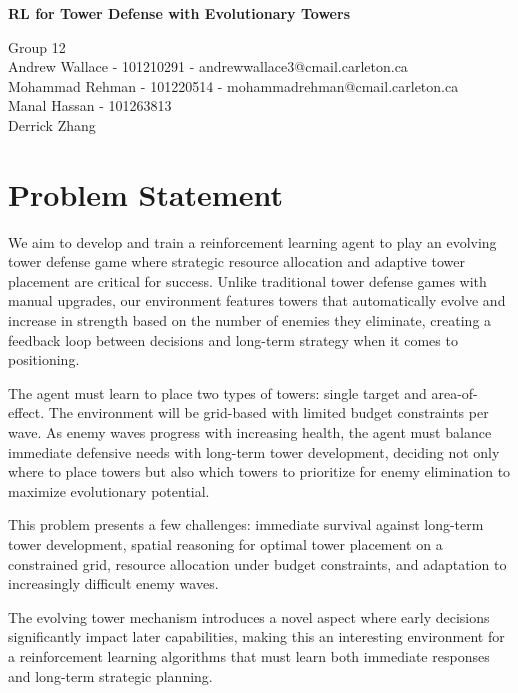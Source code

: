 \documentclass[12pt]{article}
\begin{document}
 

\begin{center} \Large\bf
RL for Tower Defense with Evolutionary Towers\\
\end{center} 

\begin{center}
Group 12 \\
Andrew Wallace - 101210291 - andrewwallace3@cmail.carleton.ca\\
Mohammad Rehman - 101220514 - mohammadrehman@cmail.carleton.ca \\
Manal Hassan - 101263813 \\
Derrick Zhang
\end{center}
\newpage 

\section*{Problem Statement}
We aim to develop and train a reinforcement learning agent to play an evolving tower defense game where strategic resource allocation and adaptive tower placement are critical for success. Unlike traditional tower defense games with manual upgrades, our environment features towers that automatically evolve and increase in strength based on the number of enemies they eliminate, creating a feedback loop between decisions and long-term strategy when it comes to positioning.\par
The agent must learn to place two types of towers: single target and area-of-effect. The environment will be grid-based with limited budget constraints per wave. As enemy waves progress with increasing health, the agent must balance immediate defensive needs with long-term tower development, deciding not only where to place towers but also which towers to prioritize for enemy elimination to maximize evolutionary potential.\par

This problem presents a few challenges: immediate survival against long-term tower development, spatial reasoning for optimal tower placement on a constrained grid, resource allocation under budget constraints, and adaptation to increasingly difficult enemy waves. \par

The evolving tower mechanism introduces a novel aspect where early decisions significantly impact later capabilities, making this an interesting environment for a reinforcement learning algorithms that must learn both immediate responses and long-term strategic planning. \par
\end{document}

